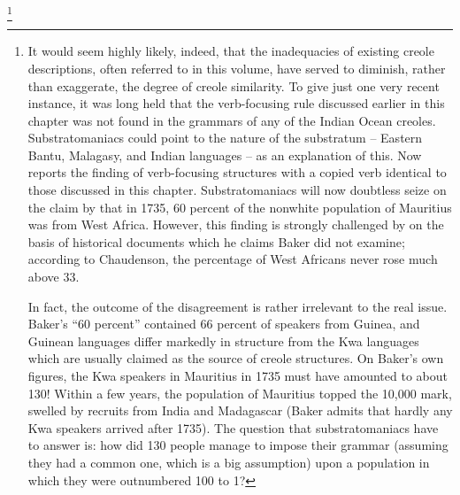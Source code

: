 \footnote{It would seem highly likely, indeed, that the inadequacies of existing creole descriptions, often referred to in this volume, have served to diminish, rather than exaggerate, the degree of creole similarity. To give just one very recent instance, it was long held that the verb-focusing rule discussed earlier in this chapter was not found in the grammars of any of the Indian Ocean creoles. Substratomaniacs could point to the nature of the substratum -- Eastern Bantu, Malagasy, and Indian languages -- as an explanation of this. Now \citet{Corne1977} reports the finding of verb-focusing structures with a copied verb identical to those discussed in this chapter. Substratomaniacs will now doubtless seize on the claim by \citet{Baker1976} that in 1735, 60 percent of the nonwhite population of Mauritius was from West Africa. However, this finding is strongly challenged by \citet{Chaudenson1979} on the basis of historical documents which he claims Baker did not examine; according to Chaudenson, the percentage of West Africans never rose much above 33.
	
In fact, the outcome of the disagreement is rather irrelevant to the real issue. Baker's ``60 percent'' contained 66 percent of speakers from Guinea, and Guinean languages differ markedly in structure from the Kwa languages which are usually claimed as the source of creole structures. On Baker's own figures, the Kwa speakers in Mauritius in 1735 must have amounted to about 130! Within a few years, the population of Mauritius topped the 10,000 mark, swelled by recruits from India and Madagascar (Baker admits that hardly any Kwa speakers arrived after 1735). The question that substratomaniacs have to answer is: how did 130 people manage to impose their grammar (assuming they had a common one, which is a big assumption) upon a population in which they were outnumbered 100 to 1?}

